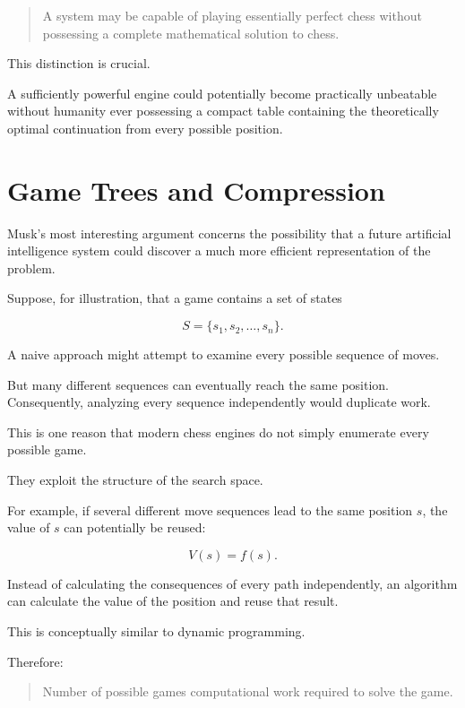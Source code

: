 \documentclass[12pt,a4paper]{article}
\begin{document}
\begin{quote}
    A system may be capable of playing essentially perfect chess
    without possessing a complete mathematical solution to chess.
\end{quote}

This distinction is crucial.

A sufficiently powerful engine could potentially become practically
unbeatable without humanity ever possessing a compact table containing
the theoretically optimal continuation from every possible position.


\section{Game Trees and Compression}

Musk's most interesting argument concerns the possibility that a future
artificial intelligence system could discover a much more efficient
representation of the problem.

Suppose, for illustration, that a game contains a set of states

\[
S = \{s_1,s_2,\ldots,s_n\}.
\]

A naive approach might attempt to examine every possible sequence of
moves.

But many different sequences can eventually reach the same position.
Consequently, analyzing every sequence independently would duplicate
work.

This is one reason that modern chess engines do not simply enumerate
every possible game.

They exploit the structure of the search space.

For example, if several different move sequences lead to the same
position \(s\), the value of \(s\) can potentially be reused:

\[
V(s) = f(s).
\]

Instead of calculating the consequences of every path independently,
an algorithm can calculate the value of the position and reuse that
result.

This is conceptually similar to dynamic programming.

Therefore:

\begin{quote}
    Number of possible games
    \neq
    computational work required to solve the game.
\end{quote}
\end{document}
